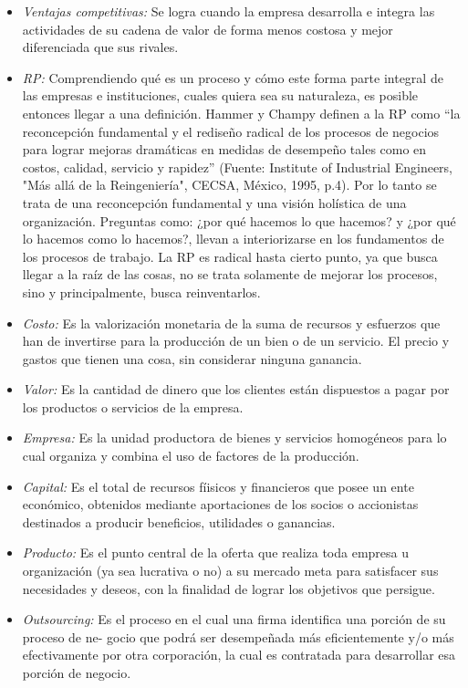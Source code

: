 \begin{itemize}
	\item \emph{Ventajas competitivas:} Se logra cuando la empresa desarrolla e integra las actividades
		 de su cadena de valor de forma menos costosa y mejor diferenciada que sus rivales. 
	\item \emph{RP:} Comprendiendo qué es un proceso y cómo este forma parte integral de las empresas e
		 instituciones, cuales quiera sea su naturaleza, es posible entonces llegar a una definición.
		 Hammer y Champy definen a la RP como “la reconcepción fundamental y el rediseño radical de los
		 procesos de negocios para lograr mejoras dramáticas en medidas de desempeño tales como en costos,
		 calidad, servicio y rapidez” (Fuente: Institute of Industrial Engineers, "Más allá de la
		 Reingeniería", CECSA, México, 1995, p.4). Por lo tanto se trata de una reconcepción fundamental
		 y una visión holística de una organización. Preguntas como: ¿por qué hacemos lo que hacemos? y
		 ¿por qué lo hacemos como lo hacemos?, llevan a interiorizarse en los fundamentos de los procesos
		 de trabajo. La RP es radical hasta cierto punto, ya que busca llegar a la raíz de las cosas,
		 no se trata solamente de mejorar los procesos, sino y principalmente, busca reinventarlos.
	\item \emph{Costo:} Es la valorización monetaria de la suma de recursos y esfuerzos que han de invertirse
		 para la producción de un bien o de un servicio. El precio y gastos que tienen una cosa, sin
		 considerar ninguna ganancia.
	\item \emph{Valor:} Es la cantidad de dinero que los clientes están dispuestos a pagar por los productos o
		 servicios de la empresa.
	\item \emph{Empresa:} Es la unidad productora de bienes y servicios homogéneos para lo cual organiza y
		 combina el uso de factores de la producción.
	\item \emph{Capital:} Es el total de recursos fíisicos y financieros que posee un ente económico, obtenidos
		 mediante aportaciones de los socios o accionistas destinados a producir beneficios, utilidades
		 o ganancias.
	\item \emph{Producto:} Es el punto central de la oferta que realiza toda empresa u organización (ya sea
		 lucrativa o no) a su mercado meta para satisfacer sus necesidades y deseos, con la finalidad
		 de lograr los objetivos que persigue.
	\item \emph{Outsourcing:} Es el proceso en el cual una firma identifica una porción de su proceso de ne-
		 gocio que podrá ser desempeñada más eficientemente y/o más efectivamente por otra
		 corporación, la cual es contratada para desarrollar esa porción de negocio.

\end{itemize}
\newpage
